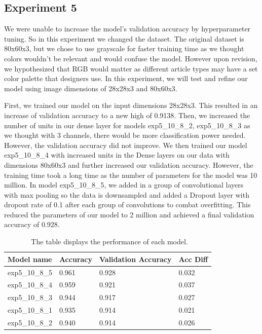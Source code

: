 \documentclass[twoside,twocolumn,9pt]{article}
\begin{document}
\subsection{Experiment 5}
We were unable to increase the model’s validation accuracy by hyperparameter tuning. So in this experiment we changed the dataset. The original dataset is 80x60x3, but we chose to use grayscale for faster training time as we thought colors wouldn’t be relevant and would confuse the model. However upon revision, we hypothesized that RGB would matter as different article types may have a set color palette that designers use. In this experiment, we will test and refine our model using image dimensions of 28x28x3 and 80x60x3. 

\noindent First, we trained our model on the input dimensions 28x28x3. This resulted in an increase of validation accuracy to a new high of 0.9138. Then, we increased the number of units in our dense layer for models exp5\_10\_8\_2, exp5\_10\_8\_3 as we thought with 3 channels, there would be more classification power needed. However, the validation accuracy did not improve. We then trained our model exp5\_10\_8\_4 with increased units in the Dense layers on our data with dimensions 80x60x3 and further increased our validation accuracy. However, the training time took a long time as the number of parameters for the model was 10 million. In model exp5\_10\_8\_5, we added in a group of convolutional layers with max pooling so the data is downsampled and added a Dropout layer with dropout rate of 0.1 after each group of convolutions to combat overfitting. This reduced the parameters of our model to 2 million and achieved a final validation accuracy of 0.928. 


\begin{table}[h]
\small
  \caption{\ The table displays the performance of each model.}
  \label{tbl:example1}
  \begin{tabular*}{0.48\textwidth}{@{\extracolsep{\fill}}llll}
    \hline
    Model name & Accuracy & Validation Accuracy & Acc Diff\\
    \hline
    exp5\_10\_8\_5 & 0.961 & 0.928 & 0.032\\
    exp5\_10\_8\_4  & 0.959 & 0.921 & 0.037\\
    exp5\_10\_8\_3  & 0.944 & 0.917 & 0.027\\
    exp5\_10\_8\_1  & 0.935 & 0.914 & 0.021\\
    exp5\_10\_8\_2  & 0.940 & 0.914 & 0.026\\
    \hline
  \end{tabular*}
\end{table}
\end{document}
